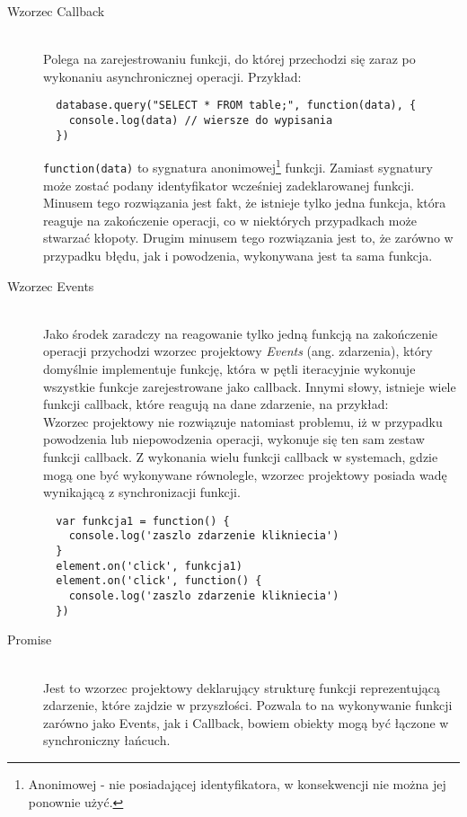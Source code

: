 \begin{description}
  \item[ Wzorzec Callback] \hfill \\
  Polega na zarejestrowaniu funkcji, do której przechodzi się zaraz po wykonaniu asynchronicznej operacji. Przykład:
  \lstset{language=Octave}
  \begin{lstlisting}
  database.query("SELECT * FROM table;", function(data), {
  	console.log(data) // wiersze do wypisania
  })
  \end{lstlisting}
  \lstinline{function(data)} to sygnatura anonimowej\footnote{Anonimowej - nie posiadającej identyfikatora, w konsekwencji nie można jej ponownie użyć.} funkcji. Zamiast sygnatury może zostać podany identyfikator wcześniej zadeklarowanej funkcji. Minusem tego rozwiązania jest fakt, że istnieje tylko jedna funkcja, która reaguje na zakończenie operacji, co w niektórych przypadkach może stwarzać kłopoty. Drugim minusem tego rozwiązania jest to, że zarówno w przypadku błędu, jak i powodzenia, wykonywana jest ta sama funkcja.
  \item[Wzorzec Events] \hfill \\
  Jako środek zaradczy na reagowanie tylko jedną funkcją na zakończenie operacji przychodzi wzorzec projektowy \emph{Events} (ang. zdarzenia), który domyślnie implementuje funkcję, która w pętli iteracyjnie wykonuje wszystkie funkcje zarejestrowane jako callback. Innymi słowy, istnieje wiele funkcji callback, które reagują na dane zdarzenie, na przykład:\\

  

  Wzorzec projektowy nie rozwiązuje natomiast problemu, iż w przypadku powodzenia lub niepowodzenia operacji, wykonuje się ten sam zestaw funkcji callback. Z wykonania wielu funkcji callback w systemach, gdzie mogą one być wykonywane równolegle, wzorzec projektowy posiada wadę wynikającą z synchronizacji funkcji.
  \lstset{language=Octave}
  \begin{lstlisting}
  var funkcja1 = function() {
  	console.log('zaszlo zdarzenie klikniecia')
  }
  element.on('click', funkcja1)
  element.on('click', function() {
  	console.log('zaszlo zdarzenie klikniecia')
  })
  \end{lstlisting}
  \item[Promise] \hfill \\
  Jest to wzorzec projektowy deklarujący strukturę funkcji reprezentującą zdarzenie, które zajdzie w przyszłości. Pozwala to na wykonywanie funkcji zarówno jako Events, jak i Callback, bowiem obiekty mogą być łączone w synchroniczny łańcuch.
\end{description}

